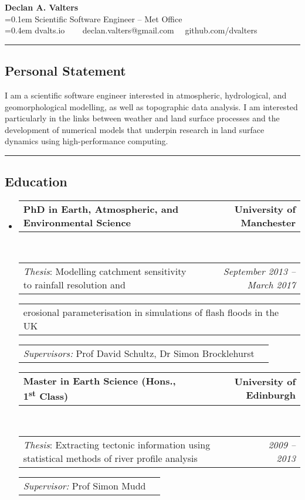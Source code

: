 \documentclass[10.5pt,a4]{article}
\makeatletter
\newcommand{\headerrow}[2]
{\begin{tabular*}{\linewidth}{l@{\extracolsep{\fill}}r}
	#1 &
	#2 \\
\end{tabular*}}
\makeatother
\begin{document}
\begin{center}
{\LARGE \textbf{Declan A. Valters}} \\
\parskip=0.1em
{Scientific Software Engineer -- Met Office} \\
\parskip=0.4em
dvalts.io  \ \textbullet
\ \ declan.valters@gmail.com \ \textbullet \ github.com/dvalters
\end{center}


\hrule
\vspace{-0.4em}
\subsection*{Personal Statement}
I am a scientific software engineer interested in atmospheric, hydrological, and geomorphological modelling, as well as topographic data analysis. I am interested particularly in the links between weather and land surface processes and the development of numerical models that underpin research in land surface dynamics using high-performance computing.
\vspace{1em}

\hrule
\vspace{-0.4em}
\subsection*{Education}
\begin{itemize}
	\parskip=0.1em
	
	\item 
	\headerrow
		{\textbf{PhD in Earth, Atmospheric, and Environmental Science}}
		{\textbf{University of Manchester}}
	\\
	\headerrow
		{\emph{Thesis}: Modelling catchment sensitivity to rainfall resolution and}
		{\emph{September 2013 -- March 2017}}
	\headerrow
		{\hspace{10mm} erosional parameterisation in simulations of flash floods in the UK}
		{}
  \headerrow
    {\emph{Supervisors:} Prof David Schultz, Dr Simon Brocklehurst}
  
	\item 
	\headerrow
		{\textbf{Master in Earth Science (Hons., 1\textsuperscript{st} Class)} }
		{\textbf{University of Edinburgh}}
	\\
	\headerrow
		{\emph{Thesis}: Extracting tectonic information using statistical methods of river profile analysis}
		{\emph{2009 -- 2013}}
	\headerrow
    {\emph{Supervisor:} Prof Simon Mudd} 
    {}
\end{itemize}
\end{document}
